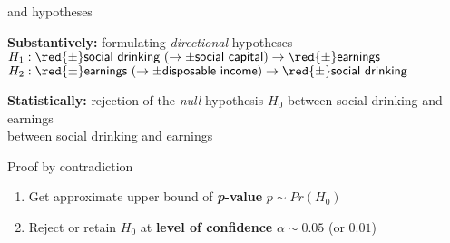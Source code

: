 \documentclass[t]{beamer}
\begin{document}
  \begin{frame}[t]{ and  hypotheses}
    
    \begin{block}{\textbf{Substantively:} formulating \emph{directional} hypotheses}
      $H_1: \red{\pm} \textsf{social drinking}~(\rightarrow \pm\textsf{social capital}) \rightarrow \red{\pm} \textsf{earnings}$\\
      $H_2: \red{\pm} \textsf{earnings}~(\rightarrow \pm\textsf{disposable income}) \rightarrow \red{\pm} \textsf{social drinking}$\\
    \end{block}

    \begin{block}{\textbf{Statistically:} rejection of the \emph{null} hypothesis $H_0$}%
        between social drinking and earnings\\
        between social drinking and earnings\\[.5em]%
    \end{block}
    
    \begin{alertblock}{Proof by contradiction}
      
      \begin{enumerate}
        \item Get approximate upper bound of \textbf{\emph{p}-value} %
          $p \sim Pr(H_0)$
        \item Reject or retain $H_0$ at %
          \textbf{level of confidence} $\alpha \sim 0.05$ (or $0.01$)
      \end{enumerate}
      
    \end{alertblock}
    
  \end{frame}
\end{document}
